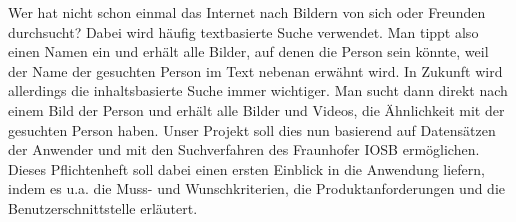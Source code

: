 Wer hat nicht schon einmal das Internet nach Bildern von sich oder Freunden durchsucht? Dabei wird häufig textbasierte Suche verwendet. Man tippt also einen Namen ein und erhält alle Bilder, auf denen die Person sein könnte, weil der Name der gesuchten Person im Text nebenan erwähnt wird. 
\newline
In Zukunft wird allerdings die inhaltsbasierte Suche immer wichtiger. Man sucht dann direkt nach einem Bild der Person und erhält alle Bilder und Videos, die Ähnlichkeit mit der gesuchten Person haben.
\newline
Unser Projekt soll dies nun basierend auf Datensätzen der Anwender und mit den Suchverfahren des Fraunhofer IOSB ermöglichen.
\newline
Dieses Pflichtenheft soll dabei einen ersten Einblick in die Anwendung liefern, indem es u.a. die Muss- und Wunschkriterien, die Produktanforderungen und die Benutzerschnittstelle erläutert.